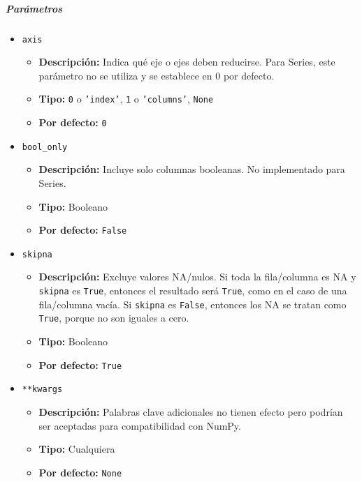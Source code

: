 \subparagraph{\textbf{Parámetros}}
\begin{itemize}
    \item \texttt{axis}
          \begin{itemize}
              \item \textbf{Descripción:} Indica qué eje o ejes deben
                    reducirse. Para Series, este parámetro no se utiliza y se establece en 0 por
                    defecto.
              \item \textbf{Tipo:} \texttt{0} o \texttt{'index'}, \texttt{1} o
                    \texttt{'columns'}, \texttt{None}
              \item \textbf{Por defecto:} \texttt{0}
          \end{itemize}
    \item \texttt{bool\_only}
          \begin{itemize}
              \item \textbf{Descripción:} Incluye solo columnas booleanas. No
                    implementado para Series.
              \item \textbf{Tipo:} Booleano
              \item \textbf{Por defecto:} \texttt{False}
          \end{itemize}
    \item \texttt{skipna}
          \begin{itemize}
              \item \textbf{Descripción:} Excluye valores NA/nulos. Si toda la
                    fila/columna es NA y \texttt{skipna} es \texttt{True}, entonces el resultado
                    será \texttt{True}, como en el caso de una fila/columna vacía. Si
                    \texttt{skipna} es \texttt{False}, entonces los NA se tratan como
                    \texttt{True}, porque no son iguales a cero.
              \item \textbf{Tipo:} Booleano
              \item \textbf{Por defecto:} \texttt{True}
          \end{itemize}
    \item \texttt{**kwargs}
          \begin{itemize}
              \item \textbf{Descripción:} Palabras clave adicionales no tienen
                    efecto pero podrían ser aceptadas para compatibilidad con NumPy.
              \item \textbf{Tipo:} Cualquiera
              \item \textbf{Por defecto:} \texttt{None}
          \end{itemize}
\end{itemize}

